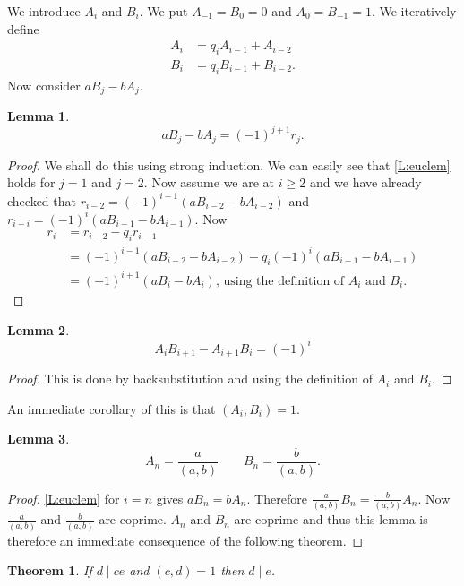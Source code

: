 \documentclass{notes}
\theoremstyle{plain}
\newtheorem{theorem}{Theorem}[chapter]
\newtheorem{lemma}{Lemma}[chapter]
\begin{document}
We introduce $A_i$ and $B_i$.  We put $A_{-1} = B_0 = 0$ and 
$A_0 = B_{-1} = 1$.  We iteratively define
\begin{align*}
A_i &= q_i A_{i-1} + A_{i-2} \\
B_i &= q_i B_{i-1} + B_{i-2}.
\end{align*}
Now consider $a B_j - b A_j$.

\begin{lemma}\label{L:euclem}
\[
a B_j - b A_j = (-1)^{j+1} r_j.
\]
\end{lemma}

\begin{proof}
We shall do this using strong induction.  We can easily see that
\eqref{L:euclem} holds for $j=1$ and $j=2$.  Now assume we
are at $i \ge 2$ and we have already checked that
$r_{i-2} = (-1)^{i-1} (a B_{i-2} - b A_{i-2})$ and
$r_{i-i} = (-1)^i (a B_{i-1} - b A_{i-1})$.  Now 
\begin{align*}
r_i &= r_{i-2}  - q_i r_{i-1} \\
&= (-1)^{i-1} (a B_{i-2} - b A_{i-2}) - q_i (-1)^i (a B_{i-1} - b A_{i-1}) \\
&= (-1)^{i+1} (a B_i - b A_i)\text{, using the definition of $A_i$ and $B_i$.}
\end{align*}
\end{proof}

\begin{lemma}\label{L:conv}
\[
A_i B_{i+1} - A_{i+1} B_i = (-1)^i
\]
\end{lemma}

\begin{proof}
This is done by backsubstitution and using the definition of $A_i$
and $B_i$.
\end{proof}

An immediate corollary of this is that $(A_i,B_i) = 1$.

\begin{lemma}
\[
A_n = \frac{a}{(a,b)} \qquad B_n = \frac{b}{(a,b)}.
\]
\end{lemma}

\begin{proof}
\eqref{L:euclem} for $i=n$ gives $a B_n = b A_n$.  Therefore
$\frac{a}{(a,b)} B_n = \frac{b}{(a,b)} A_n$.  Now $\frac{a}{(a,b)}$
and $\frac{b}{(a,b)}$ are coprime. $A_n$ and $B_n$ are coprime and thus
this lemma is therefore an immediate consequence of the following theorem.
\end{proof}

\begin{theorem}\label{T:coprime}
If $d \mid ce$ and $(c,d) = 1$ then $d \mid e$.
\end{theorem}
\end{document}
